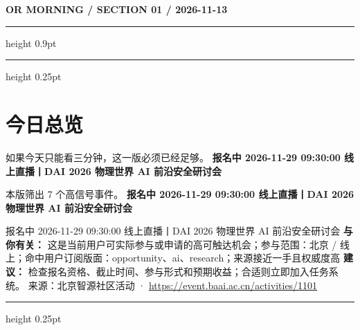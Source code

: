 \documentclass[10.5pt]{ctexart}
\begin{document}
{\small\bfseries OR MORNING / SECTION 01 / 2026-11-13}
\vspace{2mm}
\hrule height 0.9pt
\vspace{1.5mm}
\hrule height 0.25pt
\vspace{4mm}
\section*{今日总览}
{\color{ormuted} 如果今天只能看三分钟，这一版必须已经足够。}
\vspace{2mm}
{\fontsize{25}{29}\selectfont\bfseries 报名中 2026-11-29 09:30:00 线上直播丨DAI 2026 物理世界 AI 前沿安全研讨会}\par
\vspace{2mm}
{\large 本版筛出 7 个高信号事件。}
\vspace{3mm}
{\Large\bfseries 报名中 2026-11-29 09:30:00 线上直播丨DAI 2026 物理世界 AI 前沿安全研讨会}\par
报名中 2026-11-29 09:30:00 线上直播丨DAI 2026 物理世界 AI 前沿安全研讨会
\textbf{与你有关：} 这是当前用户可实际参与或申请的高可触达机会；参与范围：北京 / 线上；命中用户订阅版面：opportunity、ai、research；来源接近一手且权威度高
\textbf{建议：} 检查报名资格、截止时间、参与形式和预期收益；合适则立即加入任务系统。
{\footnotesize\color{ormuted} 来源：北京智源社区活动 · \url{https://event.baai.ac.cn/activities/1101}}
\vspace{3mm}
\hrule height 0.25pt
\vspace{3mm}
\end{document}
